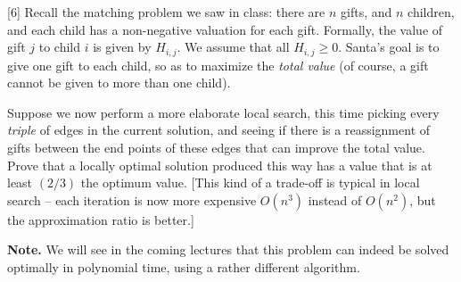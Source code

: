 \documentclass[addpoints, 11pt]{exam}
\begin{document}
\begin{questions}

[6]
Recall the matching problem we saw in class: there are $n$ gifts, and $n$ children, and each child has a non-negative valuation for each gift. Formally, the value of gift $j$ to child $i$ is given by $H_{i,j}$.  We assume that all $H_{i,j} \ge 0$. Santa's goal is to give one gift to each child, so as to maximize the {\em total value} (of course, a gift cannot be given to more than one child).

Suppose we now perform a more elaborate local search, this time picking every {\em triple} of edges in the current solution, and seeing if there is a reassignment of gifts between the end points of these edges that can improve the total value. Prove that a locally optimal solution produced this way has a value that is at least $(2/3)$ the optimum value. [This kind of a trade-off is typical in local search -- each iteration is now more expensive $O(n^3)$ instead of $O(n^2)$, but the approximation ratio is better.]

{\bf Note.}  We will see in the coming lectures that this problem can indeed be solved optimally in polynomial time, using a rather different algorithm. 

\end{questions}
\end{document}
